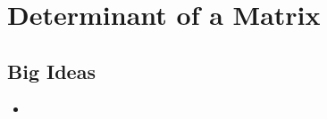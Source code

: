 \chapter{Determinant of a Matrix}
\label{chap:DM}

\section{Big Ideas}
\label{sec:DM Big Ideas}
\begin{itemize}
  \item 
\end{itemize}
